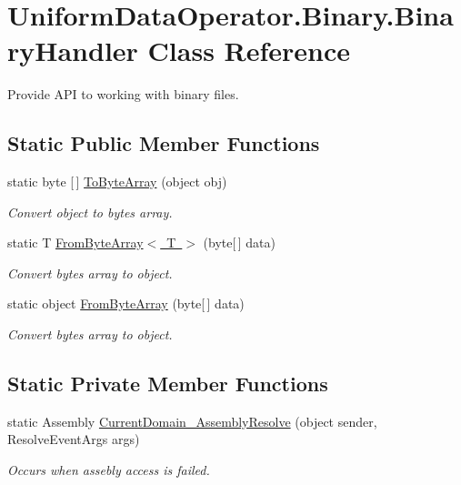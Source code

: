 \hypertarget{class_uniform_data_operator_1_1_binary_1_1_binary_handler}{}\section{Uniform\+Data\+Operator.\+Binary.\+Binary\+Handler Class Reference}
\label{class_uniform_data_operator_1_1_binary_1_1_binary_handler}


Provide A\+PI to working with binary files.  


\subsection*{Static Public Member Functions}
\begin{DoxyCompactItemize}
\item 
static byte \mbox{[}$\,$\mbox{]} \mbox{\hyperlink{class_uniform_data_operator_1_1_binary_1_1_binary_handler_abe3a726c904b29b5817e0ad39a4e1463}{To\+Byte\+Array}} (object obj)
\begin{DoxyCompactList}\small\item\em Convert object to bytes array. \end{DoxyCompactList}\item 
static T \mbox{\hyperlink{class_uniform_data_operator_1_1_binary_1_1_binary_handler_a31772237797bd25f97b204b74289df70}{From\+Byte\+Array$<$ T $>$}} (byte\mbox{[}$\,$\mbox{]} data)
\begin{DoxyCompactList}\small\item\em Convert bytes array to object. \end{DoxyCompactList}\item 
static object \mbox{\hyperlink{class_uniform_data_operator_1_1_binary_1_1_binary_handler_ac3bd422de667147216fead7602828f3a}{From\+Byte\+Array}} (byte\mbox{[}$\,$\mbox{]} data)
\begin{DoxyCompactList}\small\item\em Convert bytes array to object. \end{DoxyCompactList}\end{DoxyCompactItemize}
\subsection*{Static Private Member Functions}
\begin{DoxyCompactItemize}
\item 
static Assembly \mbox{\hyperlink{class_uniform_data_operator_1_1_binary_1_1_binary_handler_a7fa6cdd576cd1597bc1107186ec1e730}{Current\+Domain\+\_\+\+Assembly\+Resolve}} (object sender, Resolve\+Event\+Args args)
\begin{DoxyCompactList}\small\item\em Occurs when assebly access is failed. \end{DoxyCompactList}\end{DoxyCompactItemize}


